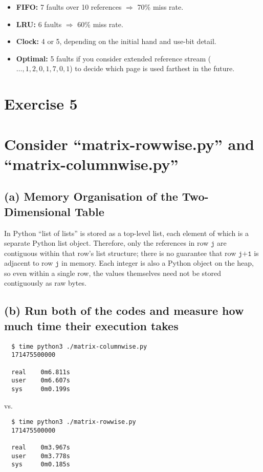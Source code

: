 \documentclass{article}
\newcommand{\exercise}[1]{
    \section*{Exercise #1}
    \markboth{Exercise #1}{}
}
\begin{document}
\begin{itemize}
  \item \textbf{FIFO:} 7 faults over 10 references $\Rightarrow$ 70\% miss rate.
  \item \textbf{LRU:} 6 faults $\Rightarrow$ 60\% miss rate.
  \item \textbf{Clock:} 4 or 5, depending on the initial hand and use-bit detail.
  \item \textbf{Optimal:} 5 faults if you consider extended reference stream 
        (\( \dots,1,2,0,1,7,0,1 \)) to decide which page is used farthest in the future.
\end{itemize}


\newpage
\exercise{5}


\section*{Consider “matrix-rowwise.py” and “matrix-columnwise.py”}

\subsection*{(a) Memory Organisation of the Two-Dimensional Table}

In Python ``list of lists'' is stored as a top-level list,
each element of which is a separate Python list object.
Therefore, only the references in row \(\texttt{j}\) are contiguous
within that row's list structure; there is no guarantee that row \(\texttt{j+1}\)
is adjacent to row \(\texttt{j}\) in memory. Each integer is also a Python object
on the heap, so even within a single row, the values themselves need not be 
stored contiguously as raw bytes.

\subsection*{(b) Run both of the codes and measure how
much time their execution takes}
\begin{verbatim}
  $ time python3 ./matrix-columnwise.py 
  171475500000

  real    0m6.811s
  user    0m6.607s
  sys     0m0.199s
\end{verbatim}

vs.

\begin{verbatim}
  $ time python3 ./matrix-rowwise.py 
  171475500000
  
  real    0m3.967s
  user    0m3.778s
  sys     0m0.185s
\end{verbatim}
\end{document}
